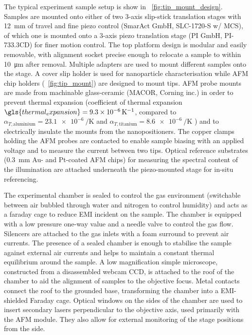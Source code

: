 \documentclass{article}
\begin{document}
The typical experiment sample setup is show in \figurename~\ref{fig:tip_mount_design}. Samples are mounted onto either of two 3-axis slip-stick translation stages with \SI{12}{mm} of travel and fine piezo control (SmarAct GmbH, SLC-1720-S w/ MCS), of which one is mounted onto a 3-axis piezo translation stage (PI GmbH, PI-733.3CD) for finer motion control. The top platform design is modular and easily removable, with alignment socket precise enough to relocate a sample to within \SI{10}{\micro\metre} after removal. Multiple adapters are used to mount different samples onto the stage. A cover slip holder is used for nanoparticle characterisation while AFM chip holders (\figurename~\ref{fig:tip_mount}) are designed to mount tips.
AFM probe mounts are made from machinable glass-ceramic (MACOR, Corning inc.) in order to prevent thermal expansion (coefficient of thermal expansion $\gls{thermal_expansion}=\SI{9.3e-6}{\per\kelvin}$, compared to $\alpha_{T,\mathrm{aluminium}}=\SI{23.1e-6}{\per\kelvin}$ and $\alpha_{T, \mathrm{titanium}}=\SI{8.6e-6}{\per\kelvin}$ \cite{haynes2013crc}) and to electrically insulate the mounts from the nanopositioners. The copper clamps holding the AFM probes are contacted to enable sample biasing with an applied voltage and to measure the current between two tips. Optical reference substrates (\SI{0.3}{mm} Au- and Pt-coated AFM chips) for measuring the spectral content of the illumination are attached underneath the piezo-mounted stage for {\color{red}in-situ} referencing.

The experimental chamber is sealed to control the gas environment (switchable between air bubbled through water and nitrogen to control humidity) and acts as a faraday cage to reduce EMI incident on the sample. The chamber is equipped with a low pressure one-way value and a needle valve to control the gas flow. Silencers are attached to the gas inlets with a foam surround to prevent air currents. The presence of a sealed chamber is enough to stabilise the sample against external air currents and helps to maintain a constant thermal equilibrium around the sample.
A low magnification simple microscope, constructed from a disassembled webcam CCD, is attached to the roof of the chamber to aid the alignment of samples to the objective focus. Metal contacts connect the roof to the grounded base, transforming the chamber into a EMI-shielded Faraday cage.
Optical windows on the sides of the chamber are used to insert secondary lasers perpendicular to the objective axis, used primarily with the AFM module. They also allow for external monitoring of the stage positions from the side.

\FloatBarrier
\end{document}
